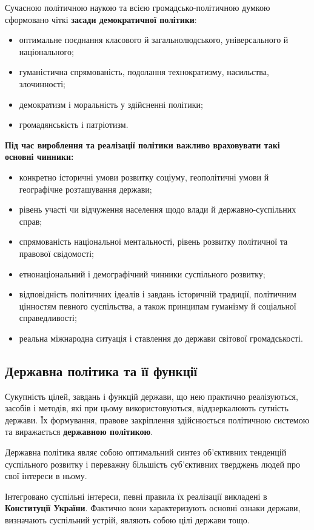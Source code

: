 Сучасною політичною наукою та всією громадсько-політичною думкою сформовано чіткі \textbf{засади демократичної політики}:
\begin{itemize}
\item оптимальне поєднання класового й загальнолюдського, універсального й національного;
\item гуманістична спрямованість, подолання технократизму, насильства, злочинності;
\item демократизм і моральність у здійсненні політики;
\item громадянськість і патріотизм.
\end{itemize}

\noindent\textbf{Під час вироблення та реалізації політики важливо враховувати такі основні чинники:}
\begin{itemize}
\item конкретно історичні умови розвитку соціуму, геополітичні умови й географічне розташування держави;
\item рівень участі чи відчуження населення щодо влади й державно-суспільних справ;
\item спрямованість національної ментальності, рівень розвитку політичної та правової свідомості;
\item етнонаціональний і демографічний чинники суспільного розвитку;
\item відповідність політичних ідеалів і завдань історичній традиції, політичним цінностям певного суспільства, а також принципам гуманізму й соціальної справедливості;
\item реальна міжнародна ситуація і ставлення до держави світової громадськості.
\end{itemize}
\subsection{Державна політика та її функції}
Сукупність цілей, завдань і функцій держави, що нею практично реалізуються, засобів і методів, які при цьому використовуються, віддзеркалюють сутність держави. Їх формування, правове закріплення здійснюється політичною системою та виражається \textbf{державною політикою}.

Державна політика являє собою оптимальний синтез об’єктивних тенденцій суспільного розвитку і переважну більшість суб’єктивних тверджень людей про свої інтереси в ньому.

Інтегровано суспільні інтереси, певні правила їх реалізації викладені в \textbf{Конституції України}. Фактично вони характеризують основні ознаки держави, визначають суспільний устрій, являють собою цілі держави тощо.

